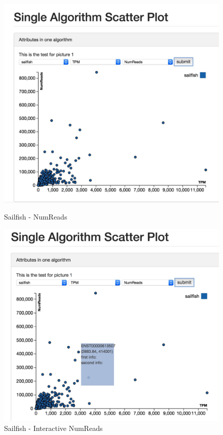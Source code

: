 \documentclass[11pt,letter]{article}
\begin{document}
\begin{figure}[ht]
\centering
\begin{minipage}[b]{0.47\linewidth}
\includegraphics[width=1.0\textwidth]{./fig/single_algo_sailfish.jpg}
\caption{Sailfish - NumReads}
\label{fig:single_algo_sailfish}
\end{minipage}
\quad
\begin{minipage}[b]{0.47\linewidth}
\includegraphics[width=1.0\textwidth]{./fig/interactive_single_algo_sailfish.jpg}
\caption{Sailfish - Interactive NumReads}
\label{fig:interactive_single_algo_sailfish}
\end{minipage}
\end{figure}
\end{document}
